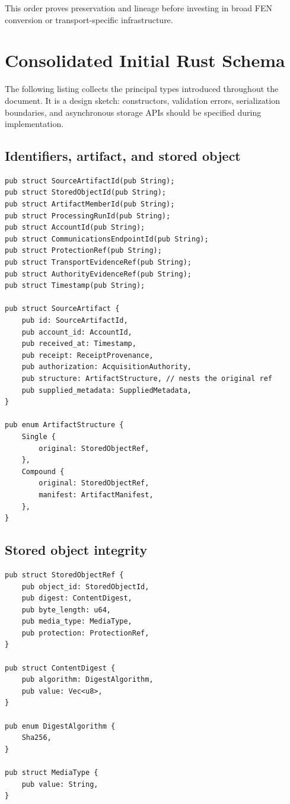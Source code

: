 \documentclass[11pt]{article}
\begin{document}
This order proves preservation and lineage before investing in broad FEN conversion or transport-specific infrastructure.

\appendix
\section{Consolidated Initial Rust Schema}

The following listing collects the principal types introduced throughout the document. It is a design sketch: constructors, validation errors, serialization boundaries, and asynchronous storage APIs should be specified during implementation.

\subsection{Identifiers, artifact, and stored object}

\begin{lstlisting}
pub struct SourceArtifactId(pub String);
pub struct StoredObjectId(pub String);
pub struct ArtifactMemberId(pub String);
pub struct ProcessingRunId(pub String);
pub struct AccountId(pub String);
pub struct CommunicationsEndpointId(pub String);
pub struct ProtectionRef(pub String);
pub struct TransportEvidenceRef(pub String);
pub struct AuthorityEvidenceRef(pub String);
pub struct Timestamp(pub String);

pub struct SourceArtifact {
    pub id: SourceArtifactId,
    pub account_id: AccountId,
    pub received_at: Timestamp,
    pub receipt: ReceiptProvenance,
    pub authorization: AcquisitionAuthority,
    pub structure: ArtifactStructure, // nests the original ref
    pub supplied_metadata: SuppliedMetadata,
}

pub enum ArtifactStructure {
    Single {
        original: StoredObjectRef,
    },
    Compound {
        original: StoredObjectRef,
        manifest: ArtifactManifest,
    },
}
\end{lstlisting}

\Needspace{0.35\textheight}
\subsection{Stored object integrity}

\begin{lstlisting}
pub struct StoredObjectRef {
    pub object_id: StoredObjectId,
    pub digest: ContentDigest,
    pub byte_length: u64,
    pub media_type: MediaType,
    pub protection: ProtectionRef,
}

pub struct ContentDigest {
    pub algorithm: DigestAlgorithm,
    pub value: Vec<u8>,
}

pub enum DigestAlgorithm {
    Sha256,
}

pub struct MediaType {
    pub value: String,
}
\end{lstlisting}
\end{document}
